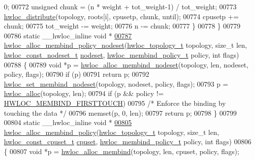 \begin{DoxyCode}
{{      0;
00772     \textcolor{keywordtype}{unsigned} chunk = (n * weight + tot\_weight-1) / tot\_weight;
00773     \hyperlink{a00059_ga6d5c88292ad5aa062c1bebc99369c042}{hwloc_distribute}(topology, roots[i], cpusetp, chunk, until);
00774     cpusetp += chunk;
00775     tot\_weight -= weight;
00776     n -= chunk;
00777   \}
00778 \}
00779 
00786 \textcolor{keyword}{static} \_\_hwloc\_inline \textcolor{keywordtype}{void} *
\hypertarget{a00031_source_l00787}{}\hyperlink{a00059_ga3e772fbc4de626ed80f13d332b7d4d03}{00787} \hyperlink{a00059_ga3e772fbc4de626ed80f13d332b7d4d03}{hwloc_alloc_membind_policy_nodeset}(\hyperlink{a00039_ga9d1e76ee15a7dee158b786c30b6a6e38}{hwloc_topology_t} topology, \textcolor{keywordtype}{size\_t} len, 
      \hyperlink{a00040_ga2f5276235841ad66a79bedad16a5a10c}{hwloc_const_nodeset_t} \hyperlink{a00016_a08f0d0e16c619a6e653526cbee4ffea3}{nodeset}, \hyperlink{a00050_gac9764f79505775d06407b40f5e4661e8}{hwloc_membind_policy_t} policy, \textcolor{keywordtype}{int} flags)
00788 \{
00789   \textcolor{keywordtype}{void} *p = \hyperlink{a00050_gaeaa00714a9c4319bda0a74ca6f8720e8}{hwloc_alloc_membind_nodeset}(topology, len, nodeset, policy, flags);
00790   \textcolor{keywordflow}{if} (p)
00791     \textcolor{keywordflow}{return} p;
00792   \hyperlink{a00050_ga747962cbb16fd12ad6d126011c734a27}{hwloc_set_membind_nodeset}(topology, nodeset, policy, flags);
00793   p = \hyperlink{a00050_gac5586e58cf25c3596b7d4aa31ce13259}{hwloc_alloc}(topology, len);
00794   \textcolor{keywordflow}{if} (p && policy != \hyperlink{a00050_ggac9764f79505775d06407b40f5e4661e8a979c7aa78dd32780858f30f47a72cca0}{HWLOC_MEMBIND_FIRSTTOUCH})
00795     \textcolor{comment}{/* Enforce the binding by touching the data */}
00796     memset(p, 0, len);
00797   \textcolor{keywordflow}{return} p;
00798 \}
00799 
00804 \textcolor{keyword}{static} \_\_hwloc\_inline \textcolor{keywordtype}{void} *
\hypertarget{a00031_source_l00805}{}\hyperlink{a00059_ga6178c6a9ec1dd88ec9f6a9fcdcc7d634}{00805} \hyperlink{a00059_ga6178c6a9ec1dd88ec9f6a9fcdcc7d634}{hwloc_alloc_membind_policy}(\hyperlink{a00039_ga9d1e76ee15a7dee158b786c30b6a6e38}{hwloc_topology_t} topology, \textcolor{keywordtype}{size\_t} len, 
      \hyperlink{a00040_ga1f784433e9b606261f62d1134f6a3b25}{hwloc_const_cpuset_t} \hyperlink{a00016_a67925e0f2c47f50408fbdb9bddd0790f}{cpuset}, \hyperlink{a00050_gac9764f79505775d06407b40f5e4661e8}{hwloc_membind_policy_t} policy, \textcolor{keywordtype}{int} flags)
00806 \{
00807   \textcolor{keywordtype}{void} *p = \hyperlink{a00050_ga221a7edc5d436300374fa16463f607e5}{hwloc_alloc_membind}(topology, len, cpuset, policy, flags);
}}
\end{DoxyCode}
